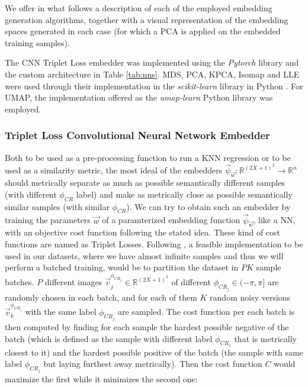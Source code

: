 \documentclass[11pt, a4paper, twoside]{article} %
\newcommand{\R}{\mathbb{R}} %
\begin{document}
We offer in what follows a description of each of the employed embedding generation algorithms, together with a visual representation of the embedding spaces generated in each case (for which a PCA is applied on the embedded training samples).

The CNN Triplet Loss embedder was implemented using the {\em Pytorch} library \cite{pytorch} and the custom architecture in Table \ref{tab:nns}. MDS, PCA, KPCA, Isomap and LLE were used through their implementation in the {\em scikit-learn} library in Python \cite{sklearn}. For UMAP, the implementation offered as the {\em umap-learn} \cite{umaplearn} Python library was employed.\vspace{-0.30cm}
\subsubsection*{Triplet Loss Convolutional Neural Network Embedder}\vspace{-0.15cm}
Both to be used as a pre-processing function to run a KNN regression or to be used as a similarity metric, the most ideal of the embedders $\vec{\psi}_{\vec{w}}:\R^{(2X+1)^2}\rightarrow \R^n$ should metrically separate as much as possible semantically different samples (with different $\phi_{CR}$ label) and make as metrically close as possible semantically similar samples (with similar $\phi_{CR}$). We can try to obtain such an embedder by training the parameters $\vec{w}$ of a paramterized embedding function $\vec{\psi}_{\vec{w}}$, like a NN, with an objective cost function following the stated idea. These kind of cost functions are named as Triplet Losses. Following \cite{triplet}, a feasible implementation to be used in our datasets, where we have almost infinite samples and thus we will perform a batched training, would be to partition the dataset in $PK$ sample batches. $P$ different images $\vec{v}_j^{\phi_{CR_j}}\in\R^{(2X+1)^2}$ of different $\phi_{CR_j}\in(-\pi,\pi]$ are randomly chosen in each batch, and for each of them $K$ random noisy versions $\vec{v}_k^{\phi_{CR_j}}$ with the same label $\phi_{CR_j}$ are sampled. The cost function per each batch is then computed by finding for each sample the hardest possible negative of the batch (which is defined as the sample with different label $\phi_{CR_s}$ that is metrically closest to it) and the hardest possible positive of the batch (the sample with same label $\phi_{CR_j}$ but laying furthest away metrically). Then the cost function $C$ would maximize the first while it minimizes the second one:\vspace{-0.1cm}
\end{document}

